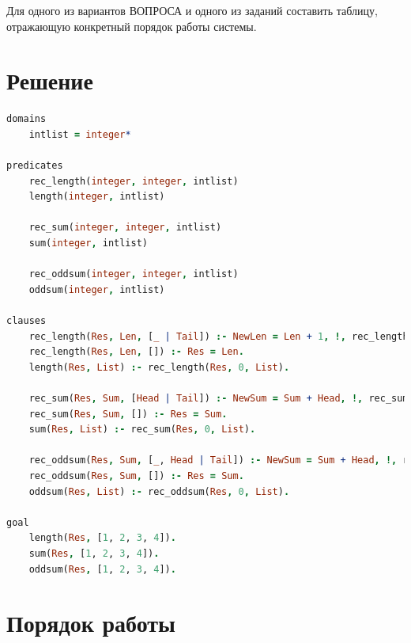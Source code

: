 \documentclass[12pt]{report}
\begin{document}
Для одного из вариантов ВОПРОСА и одного из заданий составить таблицу, отражающую конкретный порядок работы системы.

\newpage
\section*{Решение}

\begin{lstlisting}[language=prolog]
domains
	intlist = integer*

predicates
	rec_length(integer, integer, intlist)
	length(integer, intlist)
	
	rec_sum(integer, integer, intlist)
	sum(integer, intlist)
	
	rec_oddsum(integer, integer, intlist)
	oddsum(integer, intlist)

clauses
	rec_length(Res, Len, [_ | Tail]) :- NewLen = Len + 1, !, rec_length(Res, NewLen, Tail).
	rec_length(Res, Len, []) :- Res = Len.
	length(Res, List) :- rec_length(Res, 0, List).
	
	rec_sum(Res, Sum, [Head | Tail]) :- NewSum = Sum + Head, !, rec_sum(Res, NewSum, Tail).
	rec_sum(Res, Sum, []) :- Res = Sum.
	sum(Res, List) :- rec_sum(Res, 0, List).
	
	rec_oddsum(Res, Sum, [_, Head | Tail]) :- NewSum = Sum + Head, !, rec_oddsum(Res, NewSum, Tail).
	rec_oddsum(Res, Sum, []) :- Res = Sum.
	oddsum(Res, List) :- rec_oddsum(Res, 0, List).

goal
	length(Res, [1, 2, 3, 4]).
	sum(Res, [1, 2, 3, 4]).
	oddsum(Res, [1, 2, 3, 4]).
\end{lstlisting}

\section*{Порядок работы}
\end{document}
